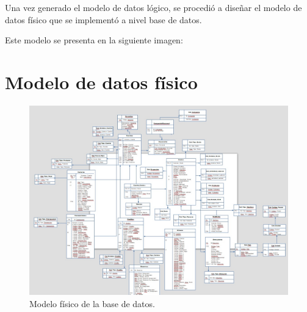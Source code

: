 Una vez generado el modelo de datos lógico, se procedió a diseñar el modelo de datos físico que se implementó a nivel base de datos.

Este modelo se presenta en la siguiente imagen:

\section{Modelo de datos físico}
\begin{figure}[htb]
  \begin{center}
    \includegraphics[width=\linewidth]{Modelo_fisico.jpg}
        \caption{Modelo físico de la base de datos.}
    \label{fig:modelo-fisico}
  \end{center}
\end{figure}

\cleardoublepage

